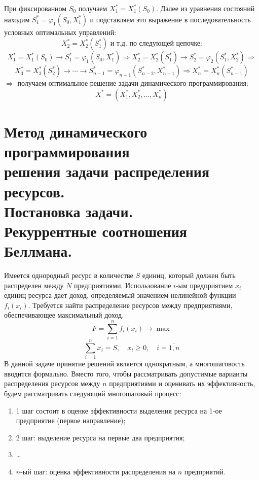 \documentclass[17pt]{extarticle}
\begin{document}
При фиксированном \( S_0 \) получаем \( X_1^* = X_1^*(S_0) \).
Далее из уравнения состояний находим \( S_1^* = \varphi_1(S_0, X_1^*) \) и подставляем это выражение
в последовательность условных оптимальных управлений:
\[
    X_2^* = X_2^*(S_1^*) \text{ и т.д. по следующей цепочке:}
\]
\[
    X_1^* = X_1^*(S_0) \rightarrow S_1^* = \varphi_1(S_0, X_1^*) \Rightarrow X_2^* = X_2^*(S_1^*) \rightarrow S_2^* = \varphi_2(S_1^*, X_2^*) \Rightarrow
\]
\[
    X_3^* = X_3^*(S_2^*) \rightarrow \cdots \rightarrow S_{n-1}^* = \varphi_{n-1}(S_{n-2}^*, X_{n-1}^*) \Rightarrow X_n^* = X_n^*(S_{n-1}^*)
\]
\(\Rightarrow\) получаем оптимальное решение задачи динамического программирования:
\[
    X^* = (X_1^*, X_2^*, \ldots, X_n^*)
\]




\section{Метод динамического программирования \\ решения задачи распределения ресурсов. \\ Постановка задачи. \\ Рекуррентные соотношения Беллмана.}
Имеется однородный ресурс в количестве \( S \) единиц, который должен быть распределен между \( N \) предприятиями.
Использование \( i \)-ым предприятием \( x_i \) единиц ресурса дает доход, определяемый значением нелинейной функции \( f_i(x_i) \).
Требуется найти распределение ресурсов между предприятиями, обеспечивающее максимальный доход.
\[
    F = \sum_{i=1}^n f_i(x_i) \rightarrow \max
\]
\[
    \sum_{i=1}^n x_i = S, \quad x_i \geq 0, \quad i = \overline{1, n}
\]
В данной задаче принятие решений является однократным, а многошаговость вводится формально.
Вместо того, чтобы рассматривать допустимые варианты распределения ресурсов между \( n \) предприятиями и оценивать их эффективность,
будем рассматривать следующий многошаговый процесс:

\begin{enumerate}
    \item 1 шаг состоит в оценке эффективности выделения ресурса на 1-ое предприятие (первое направление);
    \item 2 шаг: выделение ресурса на первые два предприятия;
    \item \ldots
    \item \( n \)-ый шаг: оценка эффективности распределения на \( n \) предприятий.
\end{enumerate}
\end{document}
